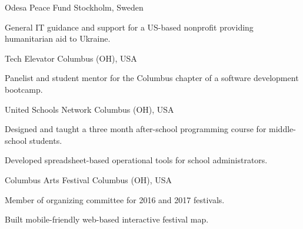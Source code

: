 

\begin{cventries}

  \cventryshort
    {Odesa Peace Fund} %
    {Stockholm, Sweden} %
    {
      \begin{cvitems} %
        \item {General IT guidance and support for a US-based nonprofit providing humanitarian aid to Ukraine.}
      \end{cvitems}
    }

  \cventryshort
    {Tech Elevator} %
    {Columbus (OH), USA} %
    {
      \begin{cvitems} %
        \item {Panelist and student mentor for the Columbus chapter of a software development bootcamp.}
      \end{cvitems}
    }

  \cventryshort
    {United Schools Network} %
    {Columbus (OH), USA} %
    {
      \begin{cvitems} %
        \item {Designed and taught a three month after-school programming course for middle-school students.}
        \item {Developed spreadsheet-based operational tools for school administrators.}
      \end{cvitems}
    }

  \cventryshort
    {Columbus Arts Festival} %
    {Columbus (OH), USA} %
    {
      \begin{cvitems} %
        \item {Member of organizing committee for 2016 and 2017 festivals.}
        \item {Built mobile-friendly web-based interactive festival map.}
      \end{cvitems}
    }

\end{cventries}
